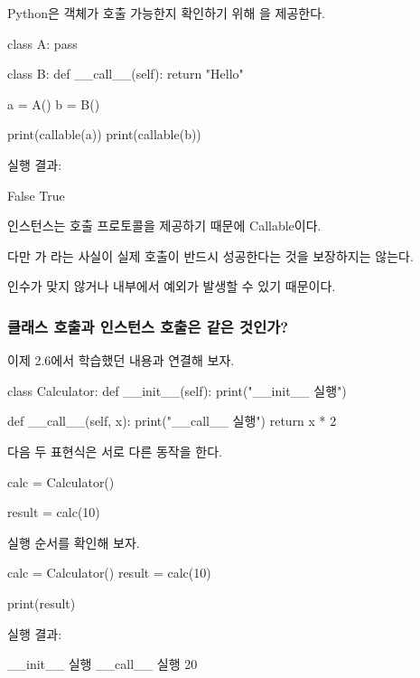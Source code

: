 Python은 객체가 호출 가능한지 확인하기 위해 을 제공한다.

\begin{dhkcode}
class A:
    pass


class B:
    def __call__(self):
        return "Hello"


a = A()
b = B()

print(callable(a))
print(callable(b))
\end{dhkcode}

실행 결과:

\begin{dhkzsh}
False
True
\end{dhkzsh}

 인스턴스는 호출 프로토콜을 제공하기 때문에 Callable이다.

다만 가 라는 사실이 실제 호출이 반드시 성공한다는 것을 보장하지는 않는다.

인수가 맞지 않거나  내부에서 예외가 발생할 수 있기 때문이다.

\subsubsection{클래스 호출과 인스턴스 호출은 같은 것인가?}

이제 2.6에서 학습했던 내용과 연결해 보자.

\begin{dhkcode}
class Calculator:
    def __init__(self):
        print("__init__ 실행")

    def __call__(self, x):
        print("__call__ 실행")
        return x * 2
\end{dhkcode}

다음 두 표현식은 서로 다른 동작을 한다.

\begin{dhkcode}
calc = Calculator()

result = calc(10)
\end{dhkcode}

실행 순서를 확인해 보자.

\begin{dhkcode}
calc = Calculator()
result = calc(10)

print(result)
\end{dhkcode}

실행 결과:

\begin{dhkzsh}
__init__ 실행
__call__ 실행
20
\end{dhkzsh}

